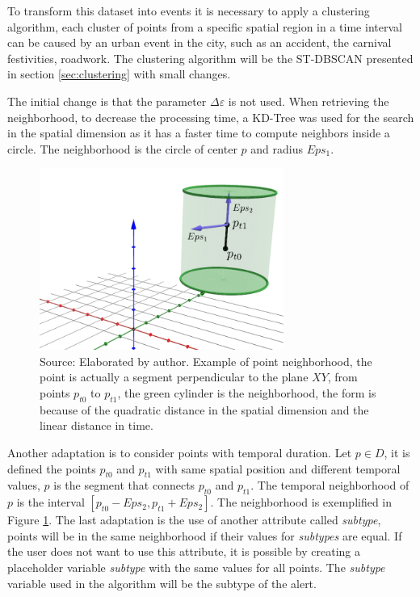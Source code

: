 To transform this dataset into events it is necessary to apply a clustering algorithm,
%
each cluster of points from a specific spatial region in a time interval can be caused by an urban event in the city, 
%
such as an accident, the carnival festivities, roadwork.
%
The clustering algorithm will be the ST-DBSCAN presented in section \ref{sec:clustering} with small changes.

%
The initial change is that the parameter $\Delta \varepsilon$ is not used. When retrieving the neighborhood, to decrease the processing time, a KD-Tree was used for the search in the spatial dimension as it has a faster time to compute neighbors inside a circle. The neighborhood is the circle of center $p$ and radius $Eps_1$.
%  

\begin{figure}
    \centering
    \includegraphics[width = 8cm]{src/imgs/point_neighborhood_stdbscan.pdf}
    \caption{Source: Elaborated by author. Example of point neighborhood, the point is actually a segment perpendicular to the plane $XY$, from points $p_{t0}$ to $p_{t1}$, the green cylinder is the neighborhood, the form is because of the quadratic distance in the spatial dimension and the linear distance in time.} 
    \label{fig:stdbscan_neighborhood}
\end{figure}

Another adaptation is to consider points with temporal duration. Let $p \in D$, it is defined the points $p_{t0}$ and $p_{t1}$ with same spatial position and different temporal values, $p$ is the segment that connects $p_{t0}$ and $p_{t1}$. The temporal neighborhood of $p$ is the interval $[p_{t0} - Eps_2, p_{t1} + Eps_2]$. The neighborhood is exemplified in Figure \ref{fig:stdbscan_neighborhood}. 
%
The last adaptation is the use of another attribute called \textit{subtype}, points will be in the same neighborhood if their values for \textit{subtypes} are equal. If the user does not want to use this attribute, it is possible by creating a placeholder variable \textit{subtype} with the same values for all points.
%
The \textit{subtype} variable used in the algorithm will be the subtype of the alert.

